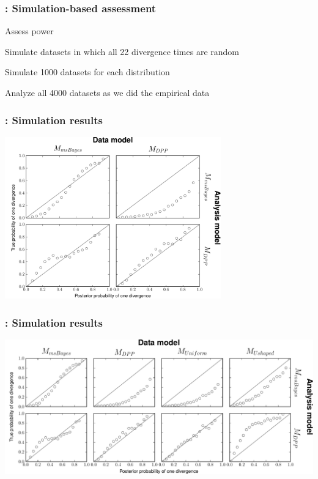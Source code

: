 \begin{frame}
    \frametitle{\dppmsbayes: Simulation-based assessment}
    Assess power \\
    \smallskip
    \begin{myitemize}
        \item Simulate datasets in which all 22 divergence times are random
        \item Simulate 1000 datasets for each \divTime{} distribution
        \item Analyze all 4000 datasets as we did the empirical data
    \end{myitemize}
\end{frame}

\begin{frame}
    \frametitle{\dppmsbayes: Simulation results}
    \centerline{
        \includegraphics[height=7.0cm]{images/validation-model-choice-old-dpp.pdf}}
\end{frame}

\begin{frame}
    \frametitle{\dppmsbayes: Simulation results}
    \centerline{
        \includegraphics[width=1.13\textwidth]{images/validation-model-choice-old-dpp-full.pdf}}
\end{frame}


